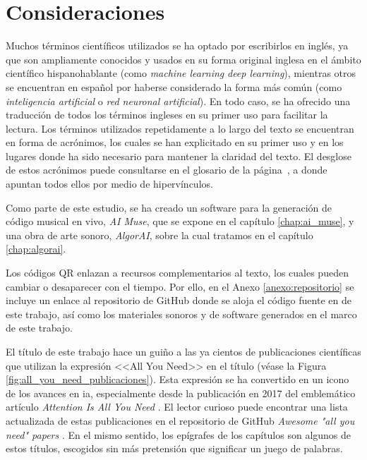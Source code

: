 \section{Consideraciones}


Muchos términos científicos utilizados se ha optado por escribirlos en inglés, ya que son ampliamente conocidos y usados en su forma original inglesa en el ámbito científico hispanohablante (como \emph{machine learning} \emph{deep learning}), mientras otros se encuentran en español por haberse considerado la forma más común (como \emph{inteligencia artificial} o \emph{red neuronal artificial}). En todo caso, se ha ofrecido una traducción de todos los términos ingleses en su primer uso para facilitar la lectura. Los términos utilizados repetidamente a lo largo del texto se encuentran en forma de acrónimos, los cuales se han explicitado en su primer uso y en los lugares donde ha sido necesario para mantener la claridad del texto. El desglose de estos acrónimos puede consultarse en el glosario de la página~\pageref{chap:glosario}, a donde apuntan todos ellos por medio de hipervínculos.

Como parte de este estudio, se ha creado un software para la generación de código musical en vivo, \emph{AI Muse}, que se expone en el capítulo \ref{chap:ai_muse}, y una obra de arte sonoro, \emph{AlgorAI}, sobre la cual tratamos en el capítulo \ref{chap:algorai}.

Los códigos QR enlazan a recursos complementarios al texto, los cuales pueden cambiar o desaparecer con el tiempo. Por ello, en el Anexo \ref{anexo:repositorio} se incluye un enlace al repositorio de GitHub donde se aloja el código fuente en  de este trabajo, así como los materiales sonoros y de software generados en el marco de este trabajo.

El título de este trabajo hace un guiño a las ya cientos de publicaciones científicas que utilizan la expresión <<All You Need>> en el título (véase la Figura \ref{fig:all_you_need_publicaciones}). Esta expresión se ha convertido en un icono de los avances en \gls{ia}, especialmente desde la publicación en 2017 del emblemático artículo \emph{Attention Is All You Need} \citep{vaswaniAttentionAllYou2017}. El lector curioso puede encontrar una lista actualizada de estas publicaciones en el repositorio de GitHub \emph{Awesome "all you need" papers} \citep{nishiKentoNishiAwesomeallyouneedpapers2024}. En el mismo sentido, los epígrafes de los capítulos son algunos de estos títulos, escogidos sin más pretensión que significar un juego de palabras.


